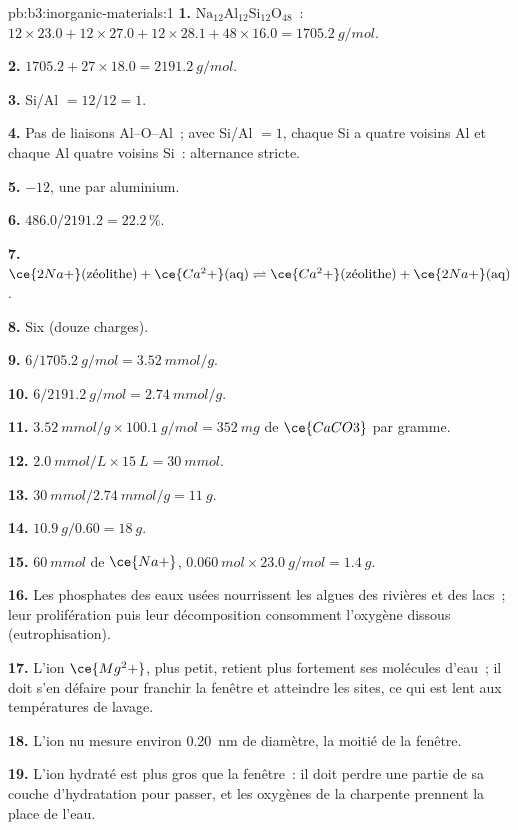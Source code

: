 \begin{solution}{pb:b3:inorganic-materials:1}
\textbf{1.} $\mathrm{Na_{12}Al_{12}Si_{12}O_{48}}$~: $12 \times 23.0 + 12 \times 27.0 + 12 \times 28.1 + 48 \times 16.0 = \qty{1705.2}{g/mol}$.

\textbf{2.} $1705.2 + 27 \times 18.0 = \qty{2191.2}{g/mol}$.

\textbf{3.} Si/Al $= 12/12 = 1$.

\textbf{4.} Pas de liaisons Al--O--Al~; avec Si/Al $= 1$, chaque Si a quatre voisins Al et
chaque Al quatre voisins Si~: alternance stricte.

\textbf{5.} $-12$, une par aluminium.

\textbf{6.} $486.0/2191.2 = 22.2$\,\%.

\textbf{7.} $\ce{2Na+}(\text{zéolithe}) + \ce{Ca^2+}(\text{aq}) \rightleftharpoons \ce{Ca^2+}(\text{zéolithe}) + \ce{2Na+}(\text{aq})$.

\textbf{8.} Six (douze charges).

\textbf{9.} $6/\qty{1705.2}{g/mol} = \qty{3.52}{mmol/g}$.

\textbf{10.} $6/\qty{2191.2}{g/mol} = \qty{2.74}{mmol/g}$.

\textbf{11.} $\qty{3.52}{mmol/g} \times \qty{100.1}{g/mol} = \qty{352}{mg}$ de $\ce{CaCO3}$ par gramme.

\textbf{12.} $\qty{2.0}{mmol/L} \times \qty{15}{L} = \qty{30}{mmol}$.

\textbf{13.} $\qty{30}{mmol}/\qty{2.74}{mmol/g} = \qty{11}{g}$.

\textbf{14.} $\qty{10.9}{g}/0.60 = \qty{18}{g}$.

\textbf{15.} $\qty{60}{mmol}$ de $\ce{Na+}$, $\qty{0.060}{mol} \times \qty{23.0}{g/mol} = \qty{1.4}{g}$.

\textbf{16.} Les phosphates des eaux usées nourrissent les algues des
rivières et des lacs~; leur prolifération puis leur décomposition
consomment l'oxygène dissous (eutrophisation).

\textbf{17.} L'ion $\ce{Mg^2+}$, plus petit, retient plus fortement ses molécules d'eau~; il doit s'en défaire
pour franchir la fenêtre et atteindre les sites, ce qui est lent aux
températures de lavage.

\textbf{18.} L'ion nu mesure environ \qty{0.20}{nm} de diamètre, la moitié de la fenêtre.

\textbf{19.} L'ion hydraté est plus gros que la fenêtre~: il doit perdre une
partie de sa couche d'hydratation pour passer, et les oxygènes de la
charpente prennent la place de l'eau.


\end{solution}
